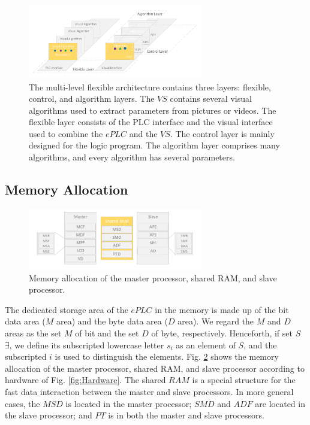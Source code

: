 \documentclass[journal,UTF8]{IEEEtran}
\begin{document}
	
	\begin{figure}
		\centering
		\includegraphics[width=3in]{fig/Software.pdf}
		\caption{The multi-level flexible architecture contains three layers: flexible, control, and algorithm layers. The $VS$ contains several visual algorithms used to extract parameters from pictures or videos. The flexible layer consists of the PLC interface and the visual interface used to combine the $ePLC$ and the $VS$. The control layer is mainly designed for the logic program. The algorithm layer comprises many algorithms, and every algorithm has several parameters.}
		\label{fig:Software}
	\end{figure}
	
	
	\subsection{Memory Allocation}
	\begin{figure}
		\centering
		\includegraphics[width=3in]{fig/RAM.pdf}
		\caption{Memory allocation of the master processor, shared RAM, and slave processor.}
		\label{fig:RAM}
	\end{figure}
	The dedicated storage area of the $ePLC$ in the memory is made up of the bit data area ($M$ area) and the byte data area ($D$ area). We regard the $M$ and $D$ areas as the set $M$ of bit and the set $D$ of byte, respectively. Henceforth, if set $S$ $\exists$, we define its subscripted lowercase letter $s_i$ as an element of $S$, and the subscripted $i$ is used to distinguish the elements. Fig. \ref{fig:RAM} shows the memory allocation of the master processor, shared RAM, and slave processor according to hardware of Fig. \ref{fig:Hardware}. The shared $RAM$ is a special structure for the fast data interaction between the master and slave processors. In more general cases, the $MSD$ is located in the master processor; $SMD$ and $ADF$ are located in the slave processor; and $PT$ is in both the master and slave processors. 
	
\end{document}
